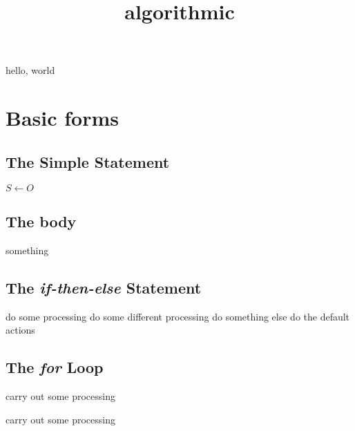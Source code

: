\documentclass{amsart}
\title{algorithmic}
\begin{document}
\maketitle

hello, world

\section{Basic forms}

\subsection{The Simple Statement}

\begin{algorithmic}[1]
\STATE $S \leftarrow O$
\end{algorithmic}

\subsection{The body}

\begin{algorithmic}[1]
\BODY
    \STATE something
\ENDBODY
\end{algorithmic}

\subsection{The \emph{if-then-else} Statement}

\begin{algorithmic}[1]
    \STATE do some processing
    \STATE do some different processing
    \STATE do something else
\ELSE
    \STATE do the default actions
\ENDIF
\end{algorithmic}

\subsection{The \emph{for} Loop}

\begin{algorithmic}[1]
    \STATE carry out some processing 
\ENDFOR
\end{algorithmic}

\begin{algorithmic}[1]
    \STATE carry out some processing 
\ENDFOR
\end{algorithmic}
\end{document}
